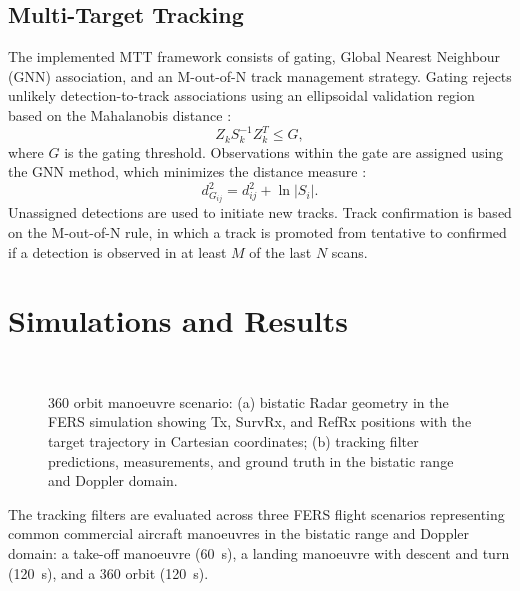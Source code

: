\documentclass[conference]{IEEEtran}
\begin{document}
\subsection{Multi-Target Tracking}
\label{sec:mtt}

The implemented MTT framework consists of gating, Global Nearest Neighbour (GNN) association, and an M-out-of-N track management strategy. Gating rejects unlikely detection-to-track associations using an ellipsoidal validation region based on the Mahalanobis distance \cite{Jerrelind2020, Richards2010}:
\begin{equation}
  Z_k S_k^{-1} Z_k^T \leq G,
\end{equation}
where $G$ is the gating threshold. Observations within the gate are assigned using the GNN method, which minimizes the distance measure \cite{Konstantinova2003}:
\begin{equation}
  d^2_{G_{ij}} = d^2_{ij} + \ln|S_i|.
\end{equation}
Unassigned detections are used to initiate new tracks. Track confirmation is based on the M-out-of-N rule, in which a track is promoted from tentative to confirmed if a detection is observed in at least $M$ of the last $N$ scans.

\section{Simulations and Results}

\begin{figure}[t]
\centering
\subfloat[]{%
  \label{fig:360_3D}%
}%
~
\subfloat[]{%
  \label{fig:360FilterOutputs}%
}%
\\[2.6mm]
\caption{360\textdegree{} orbit manoeuvre scenario: (a) bistatic Radar geometry in the FERS simulation showing Tx, SurvRx, and RefRx positions with the target trajectory in Cartesian coordinates; (b) tracking filter predictions, measurements, and ground truth in the bistatic range and Doppler domain.}
\label{fig:360_scenario}
\end{figure}

The tracking filters are evaluated across three FERS flight scenarios representing common commercial aircraft manoeuvres in the bistatic range and Doppler domain: a take-off manoeuvre (60~s), a landing manoeuvre with descent and turn (120~s), and a 360\textdegree{} orbit (120~s).
\end{document}
